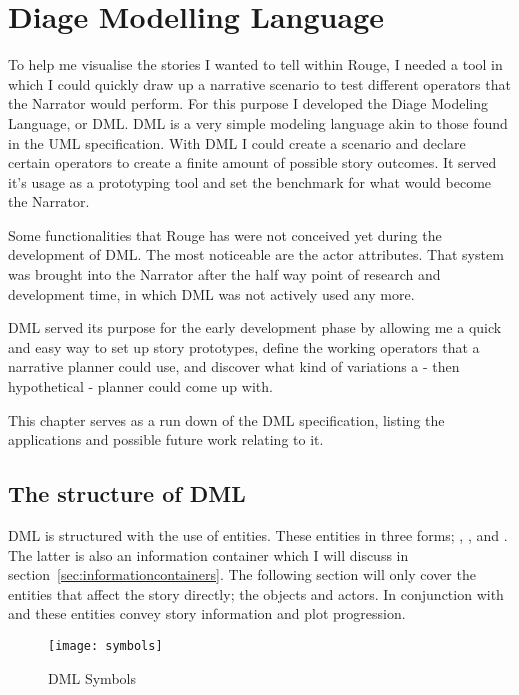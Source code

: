 \chapter{Diage Modelling Language}
\label{ch:dml}
To help me visualise the stories I wanted to tell within Rouge, I needed a tool in which I could quickly draw up a narrative scenario to test different operators that the Narrator would perform.
For this purpose I developed the Diage Modeling Language, or DML. 
DML is a very simple modeling language akin to those found in the UML specification.
With DML I could create a scenario and declare certain operators to create a finite amount of possible story outcomes. 
It served it's usage as a prototyping tool and set the benchmark for what would become the Narrator.

Some functionalities that Rouge has were not conceived yet during the development of DML. The most noticeable are the actor attributes.
That system was brought into the Narrator after the half way point of research and development time, in which DML was not actively used any more.

DML served its purpose for the early development phase by allowing me a quick and easy way to set up story prototypes, define the working operators that a narrative planner could use, and discover what kind of variations a - then hypothetical - planner could come up with.

This chapter serves as a run down of the DML specification, listing the applications and possible future work relating to it.

\section{The structure of DML}
DML is structured with the use of entities.
These entities in three forms; , , and .
The latter is also an information container which I will discuss in section~\ref{sec:informationcontainers}.
The following section will only cover the entities that affect the story directly; the objects and actors.
In conjunction with  and  these entities convey story information and plot progression.

\begin{figure}[h]
	\texttt{[image: symbols]}
	\caption{DML Symbols}
	\label{fig:DMLSymbols}	
\end{figure}


